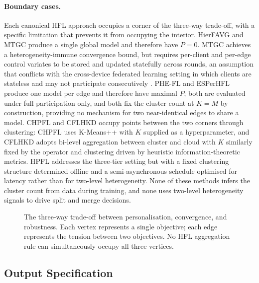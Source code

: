 \paragraph{Boundary cases.}
Each canonical HFL approach occupies a corner of the three-way trade-off, with a specific limitation that prevents it from occupying the interior. HierFAVG \cite{liu2020hierfavg} and MTGC \cite{fang2024hierarchical} produce a single global model and therefore have $P = 0$. MTGC achieves a heterogeneity-immune convergence bound, but requires per-client and per-edge control variates to be stored and updated statefully across rounds, an assumption that conflicts with the cross-device federated learning setting in which clients are stateless and may not participate consecutively \cite{kairouz2021advances}. PHE-FL \cite{lee2025phefl} and ESPerHFL \cite{ma2024personalized} produce one model per edge and therefore have maximal $P$; both are evaluated under full participation only, and both fix the cluster count at $K = M$ by construction, providing no mechanism for two near-identical edges to share a model. CHPFL \cite{song2025chpfl} and CFLHKD \cite{ahmad2025cflhkd} occupy points between the two corners through clustering: CHPFL uses K-Means++ with $K$ supplied as a hyperparameter, and CFLHKD adopts bi-level aggregation between cluster and cloud with $K$ similarly fixed by the operator and clustering driven by heuristic information-theoretic metrics. HPFL \cite{you2023hpfl} addresses the three-tier setting but with a fixed clustering structure determined offline and a semi-asynchronous schedule optimised for latency rather than for two-level heterogeneity. None of these methods infers the cluster count from data during training, and none uses two-level heterogeneity signals to drive split and merge decisions.

\begin{figure}[!t]
\centering
\caption[The three-way trade-off in hierarchical federated learning]{The three-way trade-off between personalisation, convergence, and robustness. Each vertex represents a single objective; each edge represents the tension between two objectives. No HFL aggregation rule can simultaneously occupy all three vertices.}
\label{fig:tradeoff}
\end{figure}

\subsection{Output Specification}
\label{subsec:fedge-output}


